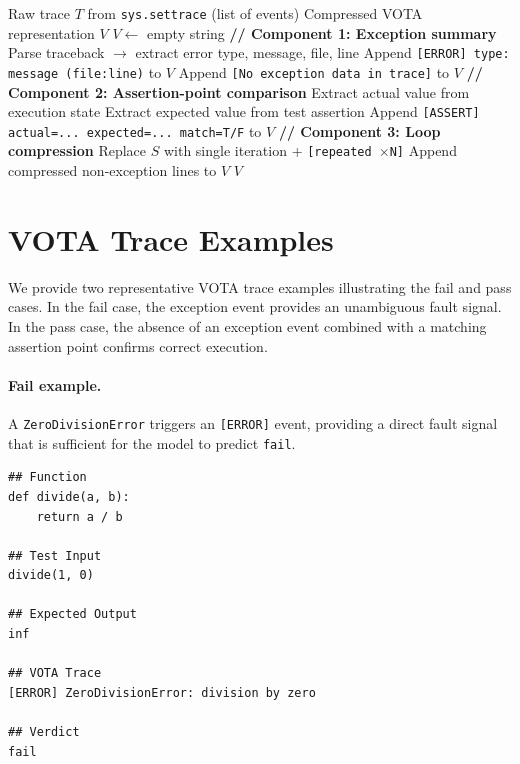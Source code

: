 \begin{algorithm}[t]
\caption{VOTA Trace Extraction}
\label{alg:vota}
\small
\begin{algorithmic}[1]
\REQUIRE Raw trace $T$ from \texttt{sys.settrace} (list of events)
\ENSURE Compressed VOTA representation $V$
\STATE $V \leftarrow$ empty string
\STATE \textbf{// Component 1: Exception summary}
  \STATE Parse traceback $\rightarrow$ extract error type, message, file, line
  \STATE Append \texttt{[ERROR] type: message (file:line)} to $V$
\ENDFOR
{}
  \STATE Append \texttt{[No exception data in trace]} to $V$
\ENDIF
\STATE \textbf{// Component 2: Assertion-point comparison}
  \STATE Extract actual value from execution state
  \STATE Extract expected value from test assertion
  \STATE Append \texttt{[ASSERT] actual=... expected=... match=T/F} to $V$
\ENDFOR
\STATE \textbf{// Component 3: Loop compression}
    \STATE Replace $S$ with single iteration + \texttt{[repeated $\times$N]}
  \ENDIF
\ENDFOR
\STATE Append compressed non-exception lines to $V$
\RETURN $V$
\end{algorithmic}
\end{algorithm}

\section{VOTA Trace Examples}
\label{sec:vota_examples}

We provide two representative VOTA trace examples illustrating the fail and pass cases.
In the fail case, the exception event provides an unambiguous fault signal.
In the pass case, the absence of an exception event combined with a matching assertion point confirms correct execution.

\paragraph{Fail example.}
A \texttt{ZeroDivisionError} triggers an \texttt{[ERROR]} event, providing a direct fault signal that is sufficient for the model to predict \texttt{fail}.

\begin{scriptsize}
\begin{verbatim}
## Function
def divide(a, b):
    return a / b

## Test Input
divide(1, 0)

## Expected Output
inf

## VOTA Trace
[ERROR] ZeroDivisionError: division by zero

## Verdict
fail
\end{verbatim}
\end{scriptsize}

